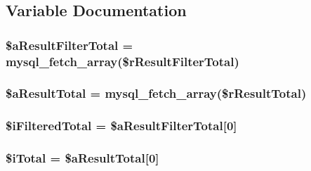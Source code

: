 \subsection{Variable Documentation}
\hypertarget{filter__col_8php_a56c6da767ba5c9ca3c5f0c103dfaa77d}{
\subsubsection[{\$a\+Result\+Filter\+Total}]{\setlength{\rightskip}{0pt plus 5cm}\$a\+Result\+Filter\+Total = mysql\+\_\+fetch\+\_\+array(\$r\+Result\+Filter\+Total)}}\label{filter__col_8php_a56c6da767ba5c9ca3c5f0c103dfaa77d}
\hypertarget{filter__col_8php_ab01fea9c7d5ce59f138eabb6206fe6b8}{
\subsubsection[{\$a\+Result\+Total}]{\setlength{\rightskip}{0pt plus 5cm}\$a\+Result\+Total = mysql\+\_\+fetch\+\_\+array(\$r\+Result\+Total)}}\label{filter__col_8php_ab01fea9c7d5ce59f138eabb6206fe6b8}
\hypertarget{filter__col_8php_a48dbbdca4a5a8b8d03ef6c76dd65a5c1}{
\subsubsection[{\$i\+Filtered\+Total}]{\setlength{\rightskip}{0pt plus 5cm}\$i\+Filtered\+Total = \$a\+Result\+Filter\+Total\mbox{[}0\mbox{]}}}\label{filter__col_8php_a48dbbdca4a5a8b8d03ef6c76dd65a5c1}
\hypertarget{filter__col_8php_a7ba288b7060e9fe77272bafe66c2403d}{
\subsubsection[{\$i\+Total}]{\setlength{\rightskip}{0pt plus 5cm}\$i\+Total = \$a\+Result\+Total\mbox{[}0\mbox{]}}}\label{filter__col_8php_a7ba288b7060e9fe77272bafe66c2403d}
